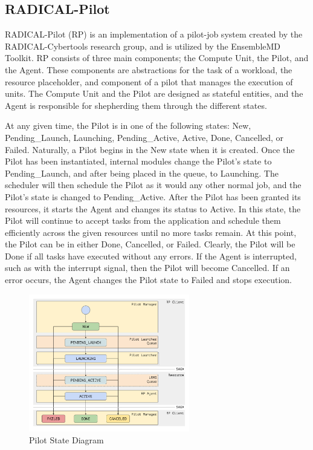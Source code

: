 \documentclass[conference]{IEEEtran}
\begin{document}
\subsection{RADICAL-Pilot}
RADICAL-Pilot (RP) is an implementation of a pilot-job system created by the RADICAL-Cybertools research group, and is utilized by the EnsembleMD Toolkit. RP consists of three main components; the Compute Unit, the Pilot, and the Agent. These components are abstractions for the task of a workload, the resource placeholder, and component of a pilot that manages the execution of units. The Compute Unit and the Pilot are designed as stateful entities, and the Agent is responsible for shepherding them through the different states. 

At any given time, the Pilot is in one of the following states: New, Pending\_Launch, Launching, Pending\_Active, Active, Done, Cancelled, or Failed. Naturally, a Pilot begins in the New state when it is created. Once the Pilot has been instantiated, internal modules change the Pilot's state to Pending\_Launch, and after being placed in the queue, to Launching. The scheduler will then schedule the Pilot as it would any other normal job, and the Pilot's state is changed to Pending\_Active. After the Pilot has been granted its resources, it starts the Agent and changes its status to Active. In this state, the Pilot will continue to accept tasks from the application and schedule them efficiently across the given resources until no more tasks remain. At this point, the Pilot can be in either Done, Cancelled, or Failed. Clearly, the Pilot will be Done if all tasks have executed without any errors. If the Agent is interrupted, such as with the interrupt signal, then the Pilot will become Cancelled. If an error occurs, the Agent changes the Pilot state to Failed and stops execution.

\begin{figure}[h]
\caption{Pilot State Diagram}
\centering
\includegraphics[width=7cm,height=6cm]{pilot-state-model}
\end{figure}
\end{document}
